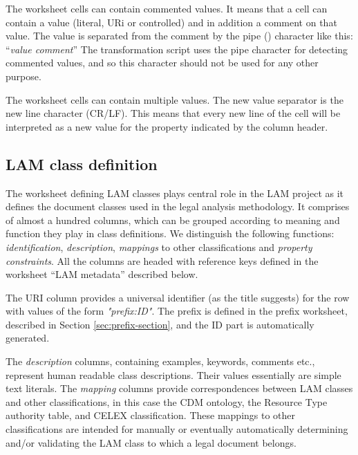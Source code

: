The worksheet cells can contain commented values. It means that a cell
can contain a value (literal, URi or controlled) and in addition a
comment on that value. The value is separated from the comment by the
pipe (\textbar{}) character like this: ``\emph{value \textbar{}
comment}''  The transformation script uses the pipe character for
detecting commented values, and so this character should not be used for
any other purpose.

The worksheet cells can contain multiple values. The new value separator
is the new line character (CR/LF). This means that every new line of the
cell will be interpreted as a new value for the property indicated by
the column header.

\subsection{LAM class definition}
\label{sec:lam-class-definition}

The worksheet defining LAM classes plays central role in the LAM project
as it defines the document classes used in the legal analysis
methodology. It comprises of almost a hundred columns, which can be
grouped according to meaning and function they play in class
definitions. We distinguish the following functions:
\emph{identification}, \emph{description}, \emph{mappings} to other
classifications and \emph{property constraints}. All the columns are
headed with reference keys defined in the worksheet ``LAM metadata'' described below.

The URI column provides a universal identifier (as the title suggests)
for the row with values of the form \emph{"prefix:ID"}. The prefix is
defined in the prefix worksheet, described in Section \ref{sec:prefix-section}, and the ID part is automatically generated.

The \emph{description} columns, containing examples, keywords, comments
etc., represent human readable class descriptions. Their values
essentially are simple text literals. The \emph{mapping} columns provide
correspondences between LAM classes and other classifications, in this
case the CDM ontology, the Resource Type authority table, and CELEX
classification. These mappings to other classifications are intended for
manually or eventually automatically determining and/or validating the LAM
class to which a legal document belongs.

